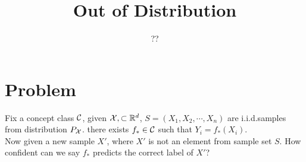 \documentclass[11pt,fullpage]{article}
\begin{document}
\title{Out of Distribution}
\author{??}
\maketitle

\section{Problem}
Fix a concept class $ {\mathcal{C}} $,
given ${\mathcal{X}},  \subset {{\mathbb{R}}}^d$, $S=(X_1, X_2,\cdots, X_n)$ are i.i.d.samples from distribution $P_{{\mathcal{X}}}$. there exists $f_*\in {\mathcal{C}}$ 
such that  $ Y_i = f_*(X_i)$. \\
Now given a new sample $X'$, where $X'$ is not an element from sample set $S$. How confident can we say $f_*$ predicts the correct label of $X'$?



\end{document}
